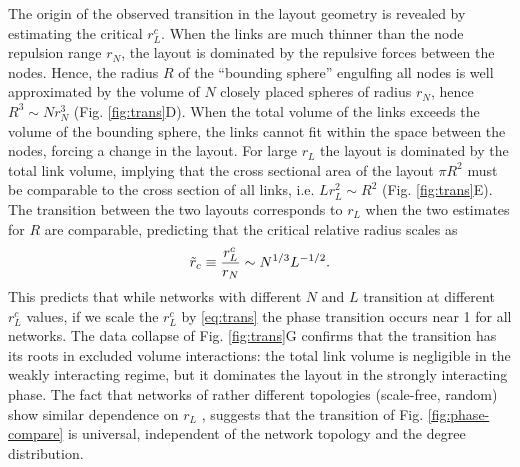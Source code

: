 \documentclass[endfloats,nofootinbib,preprint,floatfix,titlepage,superscriptaddress]{revtex4} %
\begin{document}
The origin of the observed transition in the layout geometry is revealed by estimating the critical $r_L^c$.
When the links are much thinner than the node repulsion range  $r_N$, the layout is dominated by the repulsive forces between the nodes. 
Hence, the radius $R$ of the ``bounding sphere'' engulfing all nodes is well approximated by the volume of $N$ closely placed spheres of radius $r_N$, hence $ R^3 \sim Nr_N^3 $ (Fig. \ref{fig:trans}D). 
When the total volume of the links exceeds the volume of the bounding sphere, the links cannot fit within the space between the nodes, forcing a change in the layout.  
For large $r_L$ the layout is dominated by the total link volume, implying that the cross sectional area of the layout $\pi R^2$ must be comparable to the cross section of all links, i.e. $ L r_L^2 \sim R^2$ (Fig. \ref{fig:trans}E). 
The transition between the two layouts corresponds to   $r_L$ when the two estimates for $R$ are comparable, predicting that the critical relative radius  scales as
\begin{equation}
    \tilde{r}_c \equiv {r^c_L\over r_N} \sim N^{1/3} L^{-1/2}. \label{eq:trans}
\end{equation}
This predicts that while networks with different $N$ and $L$ transition at different $r_L^c$ values, if we scale the $r_L^c$ by \eqref{eq:trans} the phase transition occurs near 1 for all networks.
The data collapse of Fig. \ref{fig:trans}G confirms that the transition has its roots in excluded volume interactions: the total link volume is negligible in the weakly interacting regime, but it dominates the layout in the strongly interacting phase.
The fact that networks of rather different topologies (scale-free, random) show similar dependence on $r_L$%
, suggests that the transition of Fig. \ref{fig:phase-compare} is universal, independent of the network topology and the degree distribution. 
\end{document}
